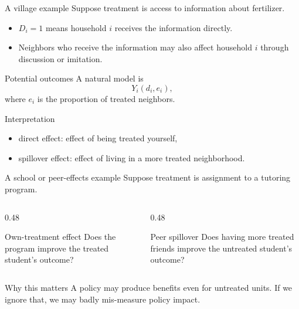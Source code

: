 \documentclass[dvipsnames,aspectratio=169,handout]{beamer}
\begin{document}
\begin{frame}{A village example}
Suppose treatment is access to information about fertilizer.

\begin{itemize}
    \item $D_i=1$ means household $i$ receives the information directly.
    \item Neighbors who receive the information may also affect household $i$ through discussion or imitation.
\end{itemize}

\begin{alertblock}{Potential outcomes}
A natural model is
\[
Y_i(d_i, e_i),
\]
where $e_i$ is the proportion of treated neighbors.
\end{alertblock}

\begin{block}{Interpretation}
\begin{itemize}
    \item direct effect: effect of being treated yourself,
    \item spillover effect: effect of living in a more treated neighborhood.
\end{itemize}
\end{block}
\end{frame}

\begin{frame}{A school or peer-effects example}
Suppose treatment is assignment to a tutoring program.

\begin{columns}[T]
\begin{column}{0.48\textwidth}
\begin{block}{Own-treatment effect}
Does the program improve the treated student's outcome?
\end{block}
\end{column}
\begin{column}{0.48\textwidth}
\begin{block}{Peer spillover}
Does having more treated friends improve the untreated student's outcome?
\end{block}
\end{column}
\end{columns}

\begin{alertblock}{Why this matters}
A policy may produce benefits even for untreated units.
If we ignore that, we may badly mis-measure policy impact.
\end{alertblock}
\end{frame}
\end{document}
